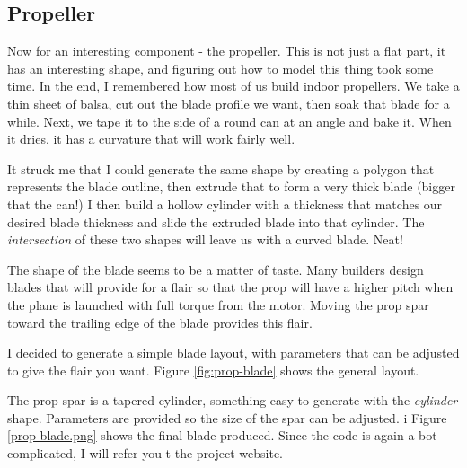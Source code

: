 \subsection{Propeller}

Now for an interesting component - the propeller. This is not just a flat part,
it has an interesting shape, and figuring out how to model this thing took some
time. In the end, I remembered how most of us build indoor propellers. We take a
thin sheet of balsa, cut out the blade profile we want, then soak that blade
for a while. Next, we tape it to the side of a round can at an angle and bake
it. When it dries, it has a curvature that will work fairly well.

It struck me that I could generate the same shape by creating a polygon that
represents the blade outline, then extrude that to form a very thick blade
(bigger that the can!) I then build a hollow cylinder with a thickness that
matches our desired blade thickness and slide the extruded blade into that cylinder.
The {\it intersection} of these two shapes will leave us with a curved blade.
Neat!

The shape of the blade seems to be a matter of taste. Many builders design
blades that will provide for a flair so that the prop will have a higher pitch
when the plane is launched with full torque from the motor. Moving the prop
spar toward the trailing edge of the blade provides this flair.

I decided to generate a simple blade layout, with parameters that can be
adjusted to give the flair you want. Figure \ref{fig:prop-blade} shows the
general layout.


The prop spar is a tapered cylinder, something easy to generate with the {\it
cylinder} shape. Parameters are provided so the size of the spar can be
adjusted.
i
Figure \ref{prop-blade.png} shows the final blade produced. Since the code is
again a bot complicated, I will refer you t the project website.



